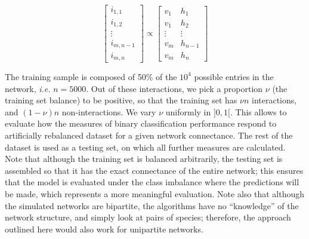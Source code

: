 \documentclass[10pt,oneside]{article}
\begin{document}
\[
\begin{bmatrix}
    i_{1,1} \\
    i_{1,2} \\
    \vdots \\
    i_{m,n-1} \\
    i_{m,n}
\end{bmatrix}
\propto
\begin{bmatrix}
           v_{1} & h_{1} \\
           v_{1} & h_{2} \\
           \vdots & \vdots \\
           v_{m} & h_{n-1} \\
           v_{m} & h_{n}
         \end{bmatrix}
\]

The training sample is composed of 50\% of the \(10^4\) possible entries
in the network, \emph{i.e.} \(n=5000\). Out of these interactions, we
pick a proportion \(\nu\) (the training set balance) to be positive, so
that the training set has \(\nu n\) interactions, and \((1-\nu) n\)
non-interactions. We vary \(\nu\) uniformly in \(]0,1[\). This allows to
evaluate how the measures of binary classification performance respond
to artificially rebalanced dataset for a given network connectance. The
rest of the dataset is used as a testing set, on which all further
measures are calculated. Note that although the training set is balanced
arbitrarily, the testing set is assembled so that it has the exact
connectance of the entire network; this ensures that the model is
evaluated under the class imbalance where the predictions will be made,
which represents a more meaningful evaluation. Note also that although
the simulated networks are bipartite, the algorithms have no
``knowledge'' of the network structure, and simply look at pairs of
species; therefore, the approach outlined here would also work for
unipartite networks.
\end{document}
